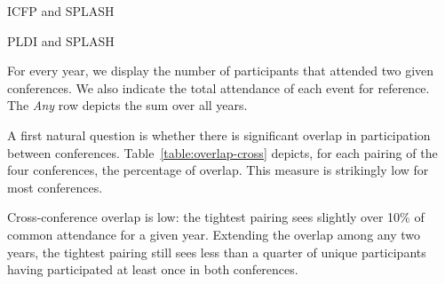 \begin{table}
  \begin{subtable}[!t]{0.48\textwidth}
    \centering
    \caption{ICFP and SPLASH}
  \end{subtable}
  \hspace{\fill}
  \begin{subtable}[!t]{0.48\textwidth}
    \centering
    \caption{PLDI and SPLASH}
  \end{subtable}
  \caption{For every year, we display the number of participants that attended two given conferences.
    We also indicate the total attendance of each event for reference.
     The \emph{Any} row depicts the sum over all years.}
  \label{table:overlap-cross}
\end{table}

A first natural question is whether there is significant overlap
in participation between conferences.
Table~\ref{table:overlap-cross} depicts, for each pairing of the four
conferences, the percentage of overlap. This measure is strikingly
low for most conferences.

\begin{obs}
Cross-conference overlap is low: the tightest pairing sees slightly over
10\% of common attendance for a given year. Extending the overlap among any
two years, the tightest pairing still sees less than a quarter of unique
participants having participated at least once in both conferences.
  \label{obs:overlap-cross}
\end{obs}

